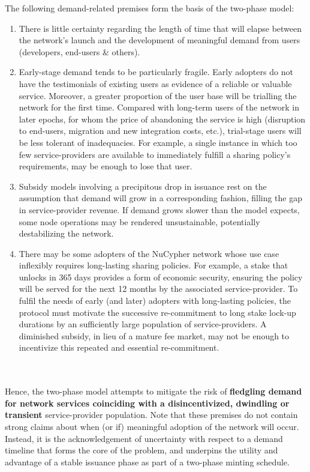 \documentclass[longbibliography,nofootinbib]{revtex4-1}
\begin{document}
The following demand-related premises form the basis of the two-phase model: 
\begin{enumerate}
\item There is little certainty regarding the length of time that will elapse between the network's launch and the development of meaningful demand from users (developers, end-users \& others).
\item Early-stage demand tends to be particularly fragile. Early adopters do not have the testimonials of existing users as evidence of a reliable or valuable service. Moreover, a greater proportion of the user base will be trialling the network for the first time. Compared with long-term users of the network in later epochs, for whom the price of abandoning the service is high (disruption to end-users, migration and new integration costs, etc.), trial-stage users will be less tolerant of inadequacies. For example, a single instance in which too few service-providers are available to immediately fulfill a sharing policy's requirements, may be enough to lose that user.
\item Subsidy models involving a precipitous drop in issuance rest on the assumption that demand will grow in a corresponding fashion, filling the gap in service-provider revenue. If demand grows slower than the model expects, some node operations may be rendered unsustainable, potentially destabilizing the network.
\item There may be some adopters of the NuCypher network whose use case inflexibly requires long-lasting sharing policies. For example, a stake that unlocks in 365 days provides a form of economic security, ensuring the policy will be served for the next 12 months by the associated service-provider. To fulfil the needs of early (and later) adopters with long-lasting policies, the protocol must motivate the successive re-commitment to long stake lock-up durations by an sufficiently large population of service-providers. A diminished subsidy, in lieu of a mature fee market, may not be enough to incentivize this repeated and essential re-commitment. 
\end{enumerate}

\\\\
Hence, the two-phase model attempts to mitigate the risk of \textbf{fledgling demand for network services coinciding with a disincentivized, dwindling or transient} service-provider population. Note that these premises do not contain strong claims about when (or if) meaningful adoption of the network will occur. Instead, it is the acknowledgement of uncertainty with respect to a demand timeline that forms the core of the problem, and underpins the utility and advantage of a stable issuance phase as part of a two-phase minting schedule. 
\end{document}
